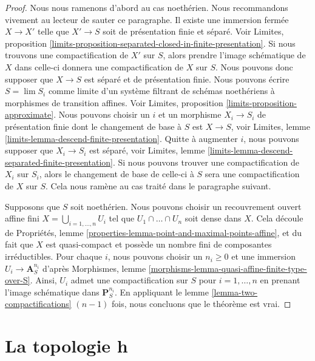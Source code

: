 \begin{proof}
Nous nous ramenons d'abord au cas noethérien. Nous recommandons vivement au lecteur
de sauter ce paragraphe. Il existe une immersion fermée
$X \to X'$ telle que $X' \to S$ soit de présentation finie et séparé.
Voir Limites, proposition
\ref{limits-proposition-separated-closed-in-finite-presentation}.
Si nous trouvons une compactification de $X'$ sur $S$, alors
prendre l'image schématique de $X$ dans celle-ci donnera
une compactification de $X$ sur $S$. Nous pouvons donc supposer que
$X \to S$ est séparé et de présentation finie.
Nous pouvons écrire $S = \lim S_i$ comme limite d'un
système filtrant de schémas noethériens à morphismes de transition affines.
Voir Limites, proposition \ref{limits-proposition-approximate}.
Nous pouvons choisir un $i$ et un morphisme $X_i \to S_i$ de présentation
finie dont le changement de base à $S$ est $X \to S$, voir
Limites, lemme \ref{limits-lemma-descend-finite-presentation}.
Quitte à augmenter $i$, nous pouvons supposer que $X_i \to S_i$ est séparé, voir
Limites, lemme \ref{limits-lemma-descend-separated-finite-presentation}.
Si nous pouvons trouver une compactification de $X_i$ sur $S_i$, alors le
changement de base de celle-ci à $S$ sera une compactification de $X$ sur $S$.
Cela nous ramène au cas traité dans le paragraphe suivant.

\medskip\noindent
Supposons que $S$ soit noethérien. Nous pouvons choisir un recouvrement ouvert affine fini
$X = \bigcup_{i = 1, \ldots, n} U_i$ tel que $U_1 \cap \ldots \cap U_n$
soit dense dans $X$. Cela découle de
Propriétés, lemme \ref{properties-lemma-point-and-maximal-points-affine},
et du fait que $X$ est quasi-compact et possède un nombre fini de
composantes irréductibles. Pour chaque $i$, nous pouvons choisir un $n_i \geq 0$ et une
immersion $U_i \to \mathbf{A}^{n_i}_S$ d'après
Morphismes, lemme \ref{morphisms-lemma-quasi-affine-finite-type-over-S}.
Ainsi, $U_i$ admet une compactification sur $S$ pour $i = 1, \ldots, n$
en prenant l'image schématique dans $\mathbf{P}^{n_i}_S$.
En appliquant le lemme \ref{lemma-two-compactifications}
$(n - 1)$ fois, nous concluons que le théorème est vrai.
\end{proof}






\section{La topologie h}
\label{section-h}

